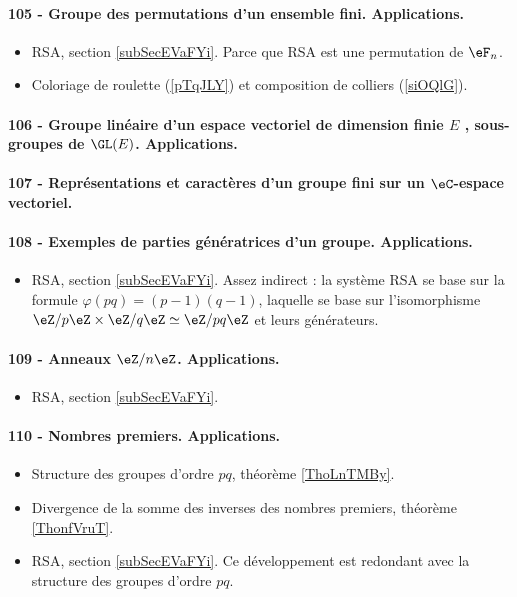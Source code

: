 \paragraph{105 - Groupe des permutations d’un ensemble fini. Applications.}
\begin{itemize}
    \item RSA, section \ref{subSecEVaFYi}. Parce que RSA est une permutation de \( \eF_n\).
    \item Coloriage de roulette (\ref{pTqJLY}) et composition de colliers (\ref{siOQlG}).
\end{itemize}

\paragraph{106 - Groupe linéaire d’un espace vectoriel de dimension finie $E$ , sous-groupes de $\GL(E)$. Applications.}

\paragraph{107 - Représentations et caractères d’un groupe fini sur un \( \eC\)-espace vectoriel.}

\paragraph{108 - Exemples de parties génératrices d’un groupe. Applications.}
\begin{itemize}
    \item RSA, section \ref{subSecEVaFYi}. Assez indirect : la système RSA se base sur la formule \( \varphi(pq)=(p-1)(q-1)\), laquelle se base sur l'isomorphisme \( \eZ/p\eZ\times \eZ/q\eZ\simeq \eZ/pq\eZ\) et leurs générateurs.
\end{itemize}

\paragraph{109 - Anneaux $\eZ/n\eZ$. Applications.}
\begin{itemize}
    \item RSA, section \ref{subSecEVaFYi}.
\end{itemize}

\paragraph{110 - Nombres premiers. Applications.}
\begin{itemize}
    \item Structure des groupes d'ordre \( pq\), théorème \ref{ThoLnTMBy}.
    \item Divergence de la somme des inverses des nombres premiers, théorème \ref{ThonfVruT}.
    \item RSA, section \ref{subSecEVaFYi}. Ce développement est redondant avec la structure des groupes d'ordre \( pq\).
\end{itemize}

